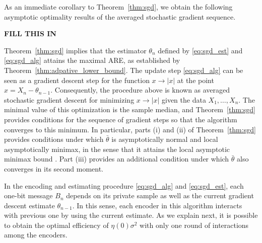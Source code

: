 As an immediate corollary to Theorem~\ref{thm:sgd}, we obtain the following
asymptotic optimality results of the averaged stochastic gradient
sequence.

\textbf{FILL THIS IN}


Theorem~\ref{thm:sgd} implies that the estimator ${\theta}_n$ defined by \eqref{eq:sgd_est} and \eqref{eq:sgd_alg} attains the maximal ARE, as established by Theorem~\ref{thm:adpative_lower_bound}. %
%
The update step \eqref{eq:sgd_alg} can be seen as a gradient descent step for the function $x\to |x|$ at the point $x=X_n - \theta_{n-1}$. Consequently, the procedure above is known as averaged stochastic gradient descent for minimizing $x \to |x|$ given the data $X_1,\ldots,X_n$. The minimal value of this optimization is the sample median, and Theorem~\ref{thm:sgd} provides conditions for the sequence of gradient steps so that the algorithm converges to this minimum. In particular, parts (i) and (ii) of Theorem~\ref{thm:sgd} provides conditions under which $\bar{\theta}$ is asymptotically normal and local asymptotically minimax, in the sense that it attains the local asymptotic minimax bound \cite{van2000asymptotic}. Part (iii) provides an additional condition under which $\bar{\theta}$ also converges in its second moment. 
 \par
In the encoding and estimating procedure \eqref{eq:sgd_alg} and \eqref{eq:sgd_est}, each one-bit message $B_n$ depends on its private sample as well as the current gradient descent estimate $\theta_{n-1}$. In this sense, each encoder in this algorithm interacts with previous one by using the current estimate.
%
As we explain next, 
it is possible to obtain the optimal efficiency of $\eta(0)\sigma^2$ with only one round of interactions among the encoders. 


